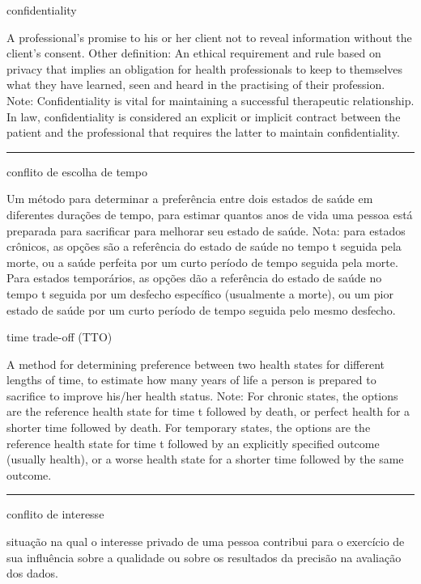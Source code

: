 \documentclass[
]{book}
\begin{document}
confidentiality

A professional's promise to his or her client not to reveal information without the client's consent. Other definition: An ethical requirement and rule based on privacy that implies an obligation for health professionals to keep to themselves what they have learned, seen and heard in the practising of their profession. Note: Confidentiality is vital for maintaining a successful therapeutic relationship. In law, confidentiality is considered an explicit or implicit contract between the patient and the professional that requires the latter to maintain confidentiality.

\begin{center}\rule{0.5\linewidth}{0.5pt}\end{center}

conflito de escolha de tempo

Um método para determinar a preferência entre dois estados de saúde em diferentes durações de tempo, para estimar quantos anos de vida uma pessoa está preparada para sacrificar para melhorar seu estado de saúde. Nota: para estados crônicos, as opções são a referência do estado de saúde no tempo t seguida pela morte, ou a saúde perfeita por um curto período de tempo seguida pela morte. Para estados temporários, as opções dão a referência do estado de saúde no tempo t seguida por um desfecho específico (usualmente a morte), ou um pior estado de saúde por um curto período de tempo seguida pelo mesmo desfecho.

time trade-off (TTO)

A method for determining preference between two health states for different lengths of time, to estimate how many years of life a person is prepared to sacrifice to improve his/her health status. Note: For chronic states, the options are the reference health state for time t followed by death, or perfect health for a shorter time followed by death. For temporary states, the options are the reference health state for time t followed by an explicitly specified outcome (usually health), or a worse health state for a shorter time followed by the same outcome.

\begin{center}\rule{0.5\linewidth}{0.5pt}\end{center}

conflito de interesse

situação na qual o interesse privado de uma pessoa contribui para o exercício de sua influência sobre a qualidade ou sobre os resultados da precisão na avaliação dos dados.
\end{document}
